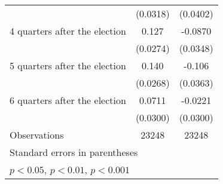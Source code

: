 \begin{table}[htbp]
\begin{tabular}{l*{2}{c}}
                    &    (0.0318)         &    (0.0402)         \\
[1em]
 4 quarters after the election&       0.127\sym{***}&     -0.0870\sym{*}  \\
                    &    (0.0274)         &    (0.0348)         \\
[1em]
 5 quarters after the election&       0.140\sym{***}&      -0.106\sym{**} \\
                    &    (0.0268)         &    (0.0363)         \\
[1em]
 6 quarters after the election&      0.0711\sym{*}  &     -0.0221         \\
                    &    (0.0300)         &    (0.0300)         \\
\hline
Observations        &       23248         &       23248         \\
\hline\hline
\multicolumn{3}{l}{\footnotesize Standard errors in parentheses}\\
\multicolumn{3}{l}{\footnotesize \sym{*} \(p<0.05\), \sym{**} \(p<0.01\), \sym{***} \(p<0.001\)}\\
\end{tabular}
\end{table}
